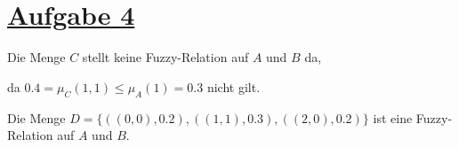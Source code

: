 \section*{\underline{Aufgabe 4}}

Die Menge $C$ stellt keine Fuzzy-Relation auf $A$ und $B$ da,

da $0.4 = \mu_C(1,1) \leq \mu_A(1) = 0.3$ nicht gilt.

Die Menge $D = \{((0,0), 0.2),((1,1), 0.3),((2,0), 0.2)\}$ ist eine Fuzzy-Relation auf $A$ und $B$.